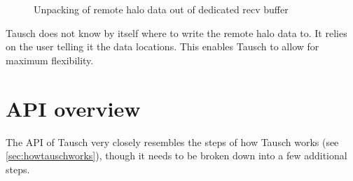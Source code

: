 \documentclass{article}
\begin{document}
\begin{enumerate}
\begin{figure}[ht]
            \caption{Unpacking of remote halo data out of dedicated recv buffer \label{fig:packfromrecv}}
        \end{figure}

        Tausch does not know by itself where to write the remote halo data to. It relies on the user telling it the data locations. This enables Tausch to allow for maximum flexibility.

\end{enumerate}



\section{API overview}

The API of Tausch very closely resembles the steps of how Tausch works (see \autoref{sec:howtauschworks}), though it needs to be broken down into a few additional steps.
\end{document}
